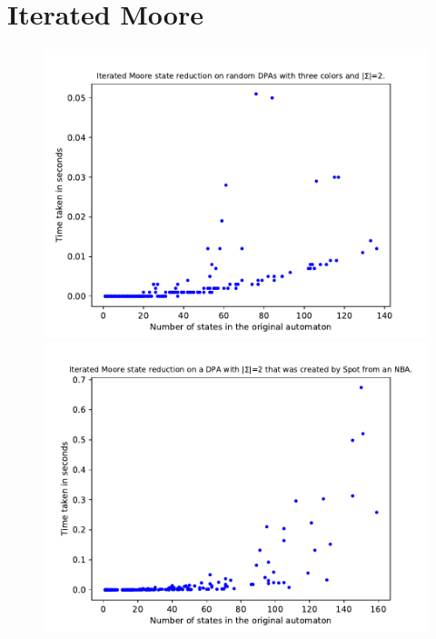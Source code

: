 \section{Iterated Moore}
\begin{figure}
	\centering
	\begin{minipage}{0.49\textwidth}
		\includegraphics[page=6,height=.3\textheight]{../data/analysis/iterated_moore/gendet_ap1.pdf} 
		\includegraphics[page=6,height=.3\textheight]{../data/analysis/iterated_moore/detspot_ap1.pdf} 

\end{minipage}
\end{figure}
